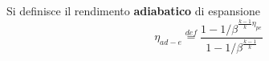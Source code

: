 \documentclass[a4paper,12pt]{article}
\begin{document}
Si definisce il rendimento \textbf{adiabatico} di espansione
\begin{equation}
    \label{eq:rendimento_espansione_adiabatico}
    \eta_{ad-e} \stackrel{def}{=} \frac{1-1/\beta^{\frac{k-1}{k}\eta_{pe}}}
    {1-1/\beta^{\frac{k-1}{k}}}
\end{equation}
\end{document}

